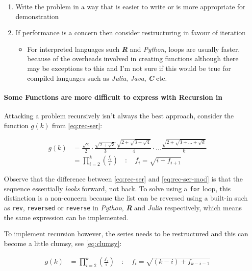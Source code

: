 \documentclass[11pt]{article}
\begin{document}
\begin{enumerate}
\item Write the problem in a way that is easier to write or is more
appropriate for demonstration
\item If performance is a concern then consider restructuring in favour of iteration
\begin{itemize}
\item For interpreted languages such \textbf{\emph{R}} and \emph{Python}, loops are usually
faster, because of the overheads involved in creating functions
\cite{smolarskiMath60Notes2000} although there may be exceptions to this and
I'm not sure if this would be true for compiled languages such as \emph{Julia},
\emph{Java}, \textbf{\emph{C}} etc.
\end{itemize}
\end{enumerate}

\paragraph{Some Functions are more difficult to express with Recursion in}
\label{some-functions-are-more-difficult-to-express-with-recursion-in-python}
Attacking a problem recursively isn't always the best approach, consider the function \(g\left( k \right)\) from \eqref{eq:rec-ser}:


\begin{align}
    g\left( k \right) &=  \frac{\sqrt{2} }{2} \cdot   \frac{\sqrt{2+  \sqrt{3}}  }{3} \frac{\sqrt{2 +  \sqrt{3 +  \sqrt{4} } } }{4} \cdot  \ldots \frac{\sqrt{2 +  \sqrt{3 +  \ldots +  \sqrt{k} } } }{k} \nonumber \\
    &=  \prod^k_{i = 2} \left( \frac{f_i}{i}  \right) \quad : \quad f_{i} = \sqrt{i +  f_{i+1}} \nonumber
\end{align}

Observe that the difference between \eqref{eq:rec-ser} and \eqref{eq:rec-ser-mod} is
that the sequence essentially \emph{looks} forward, not back. To solve using a \texttt{for}
loop, this distinction is a non-concern because the list can be reversed using a built-in
such as \texttt{rev}, \texttt{reversed} or \texttt{reverse} in \emph{Python}, \textbf{\emph{R}} and \emph{Julia}
respectively, which means the same expression can be implemented.

To implement recursion however, the series needs to be restructured and this can become a little clumsy, see \eqref{eq:clumsy}:

\begin{align}
    g\left( k \right) &=  \prod^k_{i = 2} \left( \frac{f_i}{i}  \right) \quad : \quad f_{i} = \sqrt{\left( k- i \right)  +  f_{k - i - 1}} \label{eq:clumsy}
\end{align}
\end{document}
